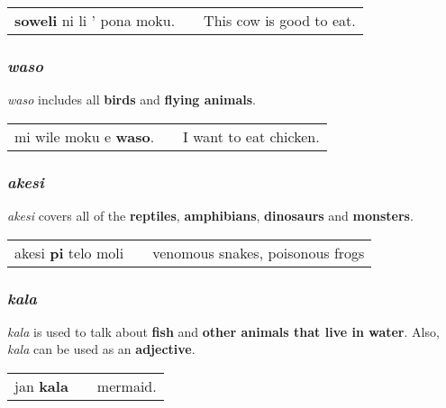 \begin{supertabular}{p{5,5cm}|ll}
\textbf{soweli} ni li ' pona moku. && This cow is good to eat. \\
\end{supertabular} 
%
\subsubsection*{\textit{waso}}
%
\textit{waso} includes all \textbf{birds} and \textbf{flying animals}. 

\begin{supertabular}{p{5,5cm}|ll}
mi wile moku e \textbf{waso}. && I want to eat chicken. \\
\end{supertabular} 
%
%
\subsubsection*{\textit{akesi}}
%
\textit{akesi} covers all of the \textbf{reptiles}, \textbf{amphibians}, \textbf{dinosaurs} and \textbf{monsters}.

\begin{supertabular}{p{5,5cm}|ll}
akesi \textbf{pi} telo moli && venomous snakes, poisonous frogs \\
\end{supertabular} 
%
\subsubsection*{\textit{kala}}
%
\textit{kala} is used to talk about \textbf{fish} and \textbf{other animals that live in water}. 
Also, \textit{kala} can be used as an \textbf{adjective}. 

\begin{supertabular}{p{5,5cm}|ll}
jan \textbf{kala} && mermaid. \\
\end{supertabular} 
%
